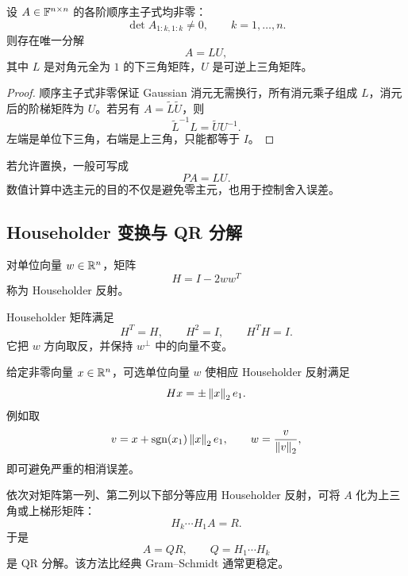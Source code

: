 \begin{theorem}
设 $A\in\mathbb F^{n\times n}$ 的各阶顺序主子式均非零：
\begin{equation}
 \det A_{1:k,1:k}\neq0,
 \qquad k=1,\ldots,n.
\end{equation}
则存在唯一分解
\begin{equation}
 A=LU,
\end{equation}
其中 $L$ 是对角元全为 $1$ 的下三角矩阵，$U$ 是可逆上三角矩阵。
\end{theorem}

\begin{proof}
顺序主子式非零保证 Gaussian 消元无需换行，所有消元乘子组成 $L$，消元后的阶梯矩阵为 $U$。若另有 $A=\widetilde L\widetilde U$，则
\begin{equation}
 \widetilde L^{-1}L=\widetilde U U^{-1}.
\end{equation}
左端是单位下三角，右端是上三角，只能都等于 $I$。
\end{proof}

\begin{remark}
若允许置换，一般可写成
\begin{equation}
 PA=LU.
\end{equation}
数值计算中选主元的目的不仅是避免零主元，也用于控制舍入误差。
\end{remark}

\subsection{Householder 变换与 QR 分解}

\begin{definition}
对单位向量 $w\in\mathbb R^n$，矩阵
\begin{equation}
 H=I-2ww^T
\end{equation}
称为 Householder 反射。
\end{definition}

\begin{proposition}
Householder 矩阵满足
\begin{equation}
 H^T=H,
 \qquad
 H^2=I,
 \qquad
 H^TH=I.
\end{equation}
它把 $w$ 方向取反，并保持 $w^\perp$ 中的向量不变。
\end{proposition}

\begin{theorem}
给定非零向量 $x\in\mathbb R^n$，可选单位向量 $w$ 使相应 Householder 反射满足
\begin{equation}
 Hx=\pm\left\lVert x\right\rVert_2e_1.
\end{equation}
例如取
\begin{equation}
 v=x+\operatorname{sgn}(x_1)\left\lVert x\right\rVert_2e_1,
 \qquad
 w=\frac{v}{\left\lVert v\right\rVert_2},
\end{equation}
即可避免严重的相消误差。
\end{theorem}

\begin{remark}
依次对矩阵第一列、第二列以下部分等应用 Householder 反射，可将 $A$ 化为上三角或上梯形矩阵：
\begin{equation}
 H_k\cdots H_1A=R.
\end{equation}
于是
\begin{equation}
 A=QR,
 \qquad
 Q=H_1\cdots H_k
\end{equation}
是 QR 分解。该方法比经典 Gram--Schmidt 通常更稳定。
\end{remark}
